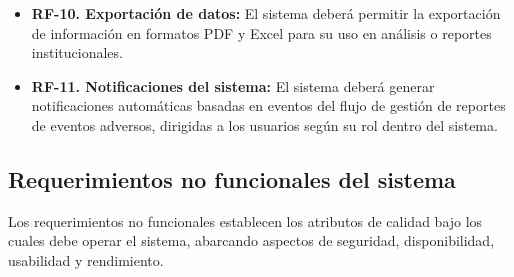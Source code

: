 \begin{itemize}
\item \textbf{RF-10. Exportación de datos:}  
El sistema deberá permitir la exportación de información en formatos PDF y Excel para su uso en análisis o reportes institucionales.

\item \textbf{RF-11. Notificaciones del sistema:}  
El sistema deberá generar notificaciones automáticas basadas en eventos del flujo de gestión de reportes de eventos adversos, dirigidas a los usuarios según su rol dentro del sistema.

\end{itemize}

\subsection{Requerimientos no funcionales del sistema}
\label{subsection:requerimiento_no_funcionales}

Los requerimientos no funcionales establecen los atributos de calidad bajo los cuales debe operar el sistema, abarcando aspectos de seguridad, disponibilidad, usabilidad y rendimiento.

